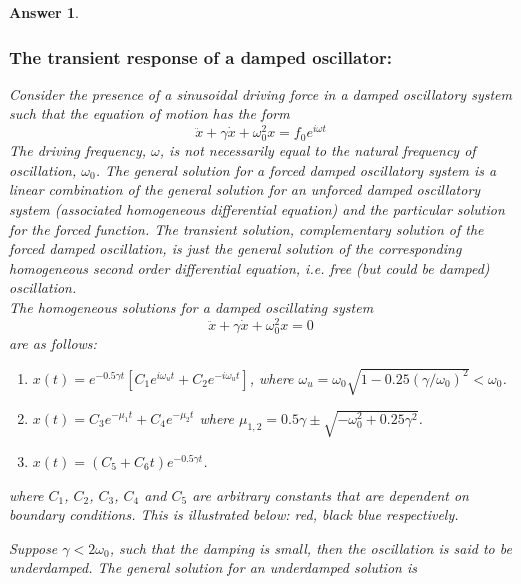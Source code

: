 \documentclass[a4paper]{article}
\newtheorem{ans}{Answer}[subsection]
\theoremstyle{new}
\begin{document}
\begin{ans}
\subsubsection*{The transient response of a damped oscillator:}
Consider the presence of a sinusoidal driving force in a damped oscillatory system such that the equation of motion has the form
$$\ddot{x}+\gamma\dot{x}+\omega_0^2x=f_0e^{i\omega t}$$
The driving frequency, $\omega$, is not necessarily equal to the natural frequency of oscillation, $\omega_0$. The general solution for a forced damped oscillatory system is a linear combination of the general solution for an unforced damped oscillatory system (associated homogeneous differential equation) and the particular solution for the forced function. The transient solution, complementary solution of the forced damped oscillation, is just the general solution of the corresponding homogeneous second order differential equation, i.e. free (but could be damped) oscillation.\\[5pt]
The homogeneous solutions for a damped oscillating system
$$\ddot{x}+\gamma\dot{x}+\omega_0^2x=0$$
are as follows:
\begin{enumerate}
    \item $x(t)=e^{-0.5\gamma t}[C_1e^{i\omega_ut}+C_2e^{-i\omega_ut}]$, where $\omega_u=\omega_0\sqrt{1-0.25(\gamma/\omega_0)^2}<\omega_0$.
    \item $x(t)=C_3e^{-\mu_1t}+C_4e^{-\mu_2t}$ where $\mu_{1,2}=0.5\gamma\pm\sqrt{-\omega_0^2+0.25\gamma^2}$.
    \item $x(t)=(C_5+C_6t)e^{-0.5\gamma t}$.
\end{enumerate}
where $C_1$, $C_2$, $C_3$, $C_4$ and $C_5$ are arbitrary constants that are dependent on boundary conditions. This is illustrated below: red, black blue respectively.
\begin{center}
\end{center}
Suppose $\gamma<2\omega_0$, such that the damping is small, then the oscillation is said to be underdamped. The general solution for an underdamped solution is

\end{ans}
\end{document}
